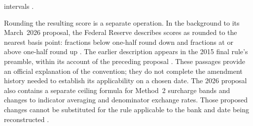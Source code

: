 intervals
\citep[GEN-3--4 and C-1; physical pp.~7--8, 25]{fry15instructionsretained2026}.

Rounding the resulting score is a separate operation. In the background to
its March~2026 proposal, the Federal Reserve describes scores as rounded to
the nearest basis point: fractions below one-half round down and fractions
at or above one-half round up
\citep[p.~14909, n.~9]{fedgsibproposal2026}.
The earlier description appears in the 2015 final rule's preamble, within
its account of the preceding proposal
\citep[p.~49084, n.~22]{fedgsibfinal2015}.
These passages provide an official explanation of the convention; they do
not complete the amendment history needed to establish its applicability
on a chosen date. The 2026 proposal also contains a separate ceiling formula
for Method~2 surcharge bands and changes to indicator averaging and
denominator exchange rates. Those proposed changes cannot be substituted
for the rule applicable to the bank and date being reconstructed
\citep[pp.~14917--14922]{fedgsibproposal2026}.
